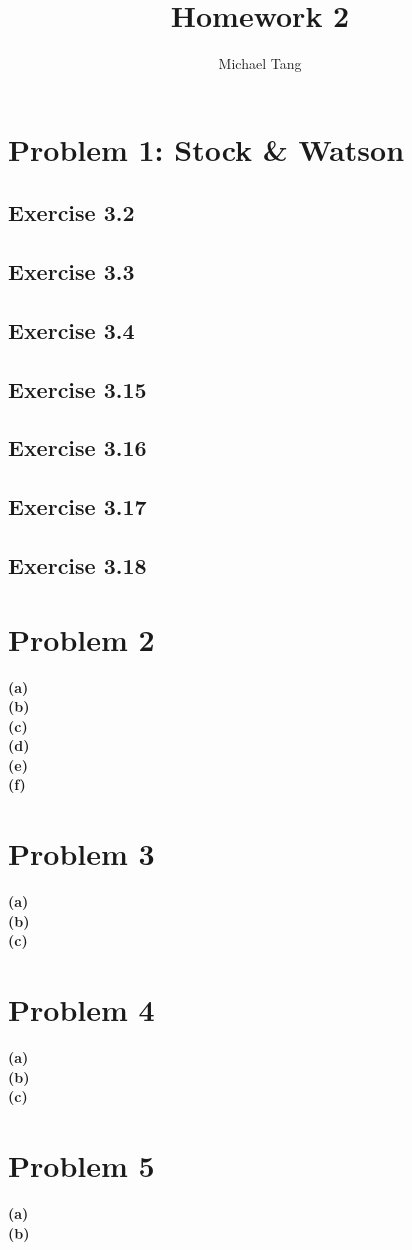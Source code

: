 \documentclass{article}
\title{Homework 2}
\author{Michael Tang}
\begin{document}
\maketitle
{}
\begin{adjustwidth}{-2cm}{-2cm}

\section{Problem 1: Stock \& Watson}
\subsection{Exercise 3.2}
\subsection{Exercise 3.3}
\subsection{Exercise 3.4}
\subsection{Exercise 3.15}
\subsection{Exercise 3.16}
\subsection{Exercise 3.17}
\subsection{Exercise 3.18}

\section{Problem 2}
\textbf{(a)}\\
\textbf{(b)}\\
\textbf{(c)}\\
\textbf{(d)}\\
\textbf{(e)}\\
\textbf{(f)}\\

\section{Problem 3}
\textbf{(a)}\\
\textbf{(b)}\\
\textbf{(c)}\\

\section{Problem 4}
\textbf{(a)}\\
\textbf{(b)}\\
\textbf{(c)}\\

\section{Problem 5}
\textbf{(a)}\\
\textbf{(b)}\\

\end{adjustwidth}
\end{document}
